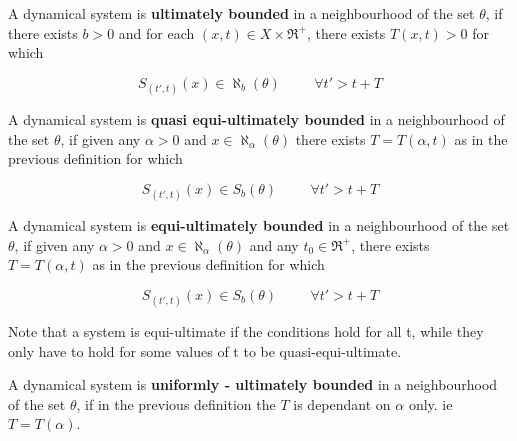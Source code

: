 \begin{defn}
   A dynamical system is {\bf ultimately bounded} in a neighbourhood of the
set $\theta$, if there exists $b > 0$ and for each $(x,t) \in X \times
\Re^{+}$, there exists $T(x,t) > 0$ for which

\[ S_{(t',t)}(x) \in \aleph_{b}(\theta) \hspace{1cm} \forall t' > t + T \]
\end{defn}

\begin{defn}
   A dynamical system is {\bf quasi equi-ultimately bounded} in a
neighbourhood of the set $\theta$, if given any $\alpha > 0$ and  $x \in
\aleph_{\alpha}(\theta)$ there exists $T = T(\alpha,t)$ as in the previous
definition for which

\[ S_{(t',t)}(x) \in S_{b}(\theta) \hspace{1cm} \forall t' > t + T \]
\end{defn}

\begin{defn}
   A dynamical system is {\bf equi-ultimately bounded} in a
neighbourhood of the set $\theta$, if given any $\alpha > 0$ and  $x \in
\aleph_{\alpha}(\theta)$ and any $t_{0} \in \Re^{+}$, there exists $T =
T(\alpha,t)$ as in the previous definition for which

\[ S_{(t',t)}(x) \in S_{b}(\theta) \hspace{1cm} \forall t' > t + T \]
\end{defn}

Note that a system is equi-ultimate if the conditions hold for all t, while
they only have to hold for some values of t to be quasi-equi-ultimate.

\begin{defn}
   A dynamical system is {\bf uniformly - ultimately bounded} in a
neighbourhood of the set $\theta$, if in the previous definition the $T$ is
dependant on $\alpha$ only. ie $T = T(\alpha)$.
\end{defn}




